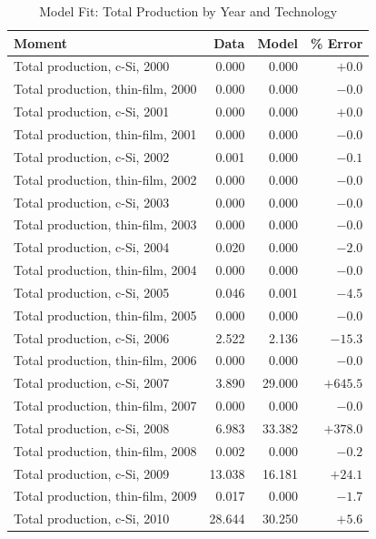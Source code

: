 \documentclass[12pt]{article}
\begin{document}
\begin{table}[htbp]
\centering
\small
\caption{Model Fit: Total Production by Year and Technology}
\label{tab:moment_fit_production}
\begin{tabular}{lrrr}
\toprule
Moment & Data & Model & \% Error \\
\midrule
Total production, c-Si, 2000 & 0.000 & 0.000 & $+0.0$ \\
Total production, thin-film, 2000 & 0.000 & 0.000 & $-0.0$ \\
Total production, c-Si, 2001 & 0.000 & 0.000 & $+0.0$ \\
Total production, thin-film, 2001 & 0.000 & 0.000 & $-0.0$ \\
Total production, c-Si, 2002 & 0.001 & 0.000 & $-0.1$ \\
Total production, thin-film, 2002 & 0.000 & 0.000 & $-0.0$ \\
Total production, c-Si, 2003 & 0.000 & 0.000 & $-0.0$ \\
Total production, thin-film, 2003 & 0.000 & 0.000 & $-0.0$ \\
Total production, c-Si, 2004 & 0.020 & 0.000 & $-2.0$ \\
Total production, thin-film, 2004 & 0.000 & 0.000 & $-0.0$ \\
Total production, c-Si, 2005 & 0.046 & 0.001 & $-4.5$ \\
Total production, thin-film, 2005 & 0.000 & 0.000 & $-0.0$ \\
Total production, c-Si, 2006 & 2.522 & 2.136 & $-15.3$ \\
Total production, thin-film, 2006 & 0.000 & 0.000 & $-0.0$ \\
Total production, c-Si, 2007 & 3.890 & 29.000 & $+645.5$ \\
Total production, thin-film, 2007 & 0.000 & 0.000 & $-0.0$ \\
Total production, c-Si, 2008 & 6.983 & 33.382 & $+378.0$ \\
Total production, thin-film, 2008 & 0.002 & 0.000 & $-0.2$ \\
Total production, c-Si, 2009 & 13.038 & 16.181 & $+24.1$ \\
Total production, thin-film, 2009 & 0.017 & 0.000 & $-1.7$ \\
Total production, c-Si, 2010 & 28.644 & 30.250 & $+5.6$ \\

\end{tabular}
\end{table}
\end{document}
